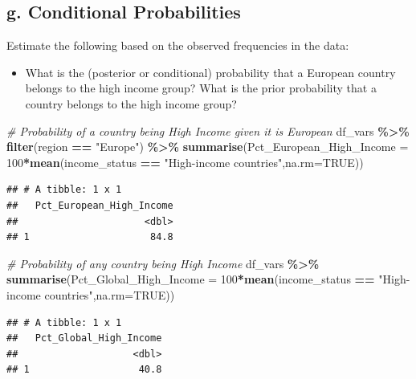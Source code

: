 \documentclass[
]{article}
\newenvironment{Shaded}{\begin{snugshade}}{\end{snugshade}}
\newcommand{\AttributeTok}[1]{\textcolor[rgb]{0.13,0.29,0.53}{#1}}
\newcommand{\CommentTok}[1]{\textcolor[rgb]{0.56,0.35,0.01}{\textit{#1}}}
\newcommand{\ConstantTok}[1]{\textcolor[rgb]{0.56,0.35,0.01}{#1}}
\newcommand{\DecValTok}[1]{\textcolor[rgb]{0.00,0.00,0.81}{#1}}
\newcommand{\FunctionTok}[1]{\textcolor[rgb]{0.13,0.29,0.53}{\textbf{#1}}}
\newcommand{\NormalTok}[1]{#1}
\newcommand{\SpecialCharTok}[1]{\textcolor[rgb]{0.81,0.36,0.00}{\textbf{#1}}}
\newcommand{\StringTok}[1]{\textcolor[rgb]{0.31,0.60,0.02}{#1}}
\providecommand{\tightlist}{%
  \setlength{\itemsep}{0pt}\setlength{\parskip}{0pt}}
\begin{document}
\subsection{g. Conditional
Probabilities}\label{g.-conditional-probabilities}

Estimate the following based on the observed frequencies in the data:

\begin{itemize}
\tightlist
\item
  What is the (posterior or conditional) probability that a European
  country belongs to the high income group? What is the prior
  probability that a country belongs to the high income group?
\end{itemize}

\begin{Shaded}
\begin{Highlighting}[]
\CommentTok{\# Probability of a country being High Income given it is European}
\NormalTok{df\_vars }\SpecialCharTok{\%\textgreater{}\%}
  \FunctionTok{filter}\NormalTok{(region }\SpecialCharTok{==} \StringTok{"Europe"}\NormalTok{) }\SpecialCharTok{\%\textgreater{}\%}
   \FunctionTok{summarise}\NormalTok{(}\AttributeTok{Pct\_European\_High\_Income =} \DecValTok{100}\SpecialCharTok{*}\FunctionTok{mean}\NormalTok{(income\_status }\SpecialCharTok{==} \StringTok{"High{-}income countries"}\NormalTok{,}\AttributeTok{na.rm=}\ConstantTok{TRUE}\NormalTok{))}
\end{Highlighting}
\end{Shaded}

\begin{verbatim}
## # A tibble: 1 x 1
##   Pct_European_High_Income
##                      <dbl>
## 1                     84.8
\end{verbatim}

\begin{Shaded}
\begin{Highlighting}[]
\CommentTok{\# Probability of any country being High Income}
\NormalTok{df\_vars }\SpecialCharTok{\%\textgreater{}\%}
   \FunctionTok{summarise}\NormalTok{(}\AttributeTok{Pct\_Global\_High\_Income =} \DecValTok{100}\SpecialCharTok{*}\FunctionTok{mean}\NormalTok{(income\_status }\SpecialCharTok{==} \StringTok{"High{-}income countries"}\NormalTok{,}\AttributeTok{na.rm=}\ConstantTok{TRUE}\NormalTok{))}
\end{Highlighting}
\end{Shaded}

\begin{verbatim}
## # A tibble: 1 x 1
##   Pct_Global_High_Income
##                    <dbl>
## 1                   40.8
\end{verbatim}
\end{document}
